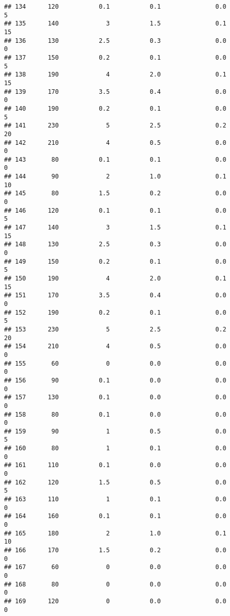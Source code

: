 \documentclass[
]{article}
\begin{document}
\begin{verbatim}
## 134      120           0.1           0.1               0.0           5
## 135      140             3           1.5               0.1          15
## 136      130           2.5           0.3               0.0           0
## 137      150           0.2           0.1               0.0           5
## 138      190             4           2.0               0.1          15
## 139      170           3.5           0.4               0.0           0
## 140      190           0.2           0.1               0.0           5
## 141      230             5           2.5               0.2          20
## 142      210             4           0.5               0.0           0
## 143       80           0.1           0.1               0.0           0
## 144       90             2           1.0               0.1          10
## 145       80           1.5           0.2               0.0           0
## 146      120           0.1           0.1               0.0           5
## 147      140             3           1.5               0.1          15
## 148      130           2.5           0.3               0.0           0
## 149      150           0.2           0.1               0.0           5
## 150      190             4           2.0               0.1          15
## 151      170           3.5           0.4               0.0           0
## 152      190           0.2           0.1               0.0           5
## 153      230             5           2.5               0.2          20
## 154      210             4           0.5               0.0           0
## 155       60             0           0.0               0.0           0
## 156       90           0.1           0.0               0.0           0
## 157      130           0.1           0.0               0.0           0
## 158       80           0.1           0.0               0.0           0
## 159       90             1           0.5               0.0           5
## 160       80             1           0.1               0.0           0
## 161      110           0.1           0.0               0.0           0
## 162      120           1.5           0.5               0.0           5
## 163      110             1           0.1               0.0           0
## 164      160           0.1           0.1               0.0           0
## 165      180             2           1.0               0.1          10
## 166      170           1.5           0.2               0.0           0
## 167       60             0           0.0               0.0           0
## 168       80             0           0.0               0.0           0
## 169      120             0           0.0               0.0           0

\end{verbatim}
\end{document}
